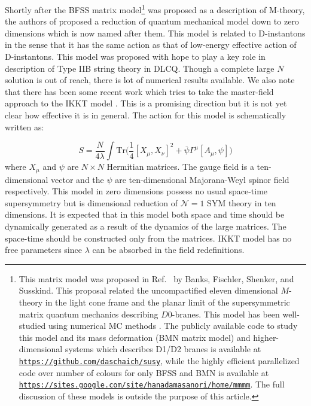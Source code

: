 \documentclass[11pt]{article}
\begin{document}
Shortly after the BFSS matrix model\footnote{This matrix model was proposed in Ref.~\cite{Banks:1996vh} by
Banks, Fischler, Shenker, and Susskind. This proposal related the 
uncompactified eleven dimensional $M$-theory in the light cone frame and the 
planar limit of the supersymmetric matrix quantum mechanics describing $D0$-branes. This model has been
well-studied using numerical MC methods \cite{}. The publicly available code to study this model and its
mass deformation (BMN matrix model) and higher-dimensional systems which describes D1/D2 branes 
\cite{Catterall:2017lub,Jha:2017zad,Catterall:2020nmn}
is available at \texttt{\href{https://github.com/daschaich/susy}{https://github.com/daschaich/susy}}, while the
highly efficient parallelized code over number of colours for only BFSS and BMN is available at
\texttt{\href{https://sites.google.com/site/hanadamasanori/home/mmmm}{https://sites.google.com/site/hanadamasanori/home/mmmm}}. The full discussion of these models is outside the purpose of this article. 
}
was proposed as a description of M-theory, the authors of 
\cite{Ishibashi:1996xs} proposed a reduction of quantum mechanical model down to zero 
dimensions which is now named after them. This model is related to D-instantons 
in the sense that it has the same action as that of low-energy effective action of D-instantons. 
This model was proposed with hope to play a key role in description of Type IIB string theory in DLCQ. 
Though a complete large $N$ solution is out of reach, there is lot of numerical results available. 
We also note that there has been some recent work which tries to take the master-field approach to the
IKKT model \cite{Klinkhamer:2021wrv}. This is a promising direction but it is not yet clear how effective it is in general.
The action for this model is schematically written as:

\begin{equation}
	\label{eq:IKKT} 
S = \frac{N}{4\lambda} \int \mbox{Tr} \Big( \frac{1}{4} [X_\mu, X_\nu]^{2} + \overline{\psi} \Gamma^{\mu} [A_{\mu},\psi] \Big) 
\end{equation}
where $X_{\mu}$ and $\psi$ are $N \times N$ Hermitian matrices. The gauge field is a ten-dimensional vector and the $\psi$ are ten-dimensional Majorana-Weyl spinor field respectively. This model in zero dimensions possess no usual space-time supersymmetry 
but is dimensional reduction of $\mathcal{N}=1$ SYM theory in ten dimensions. 
It is expected that in this model both space and time should be dynamically generated as a result of the dynamics of the large matrices. The space-time should be constructed only from the matrices. IKKT model has no free parameters since $\lambda$ can be absorbed in the field redefinitions. 
\end{document}
